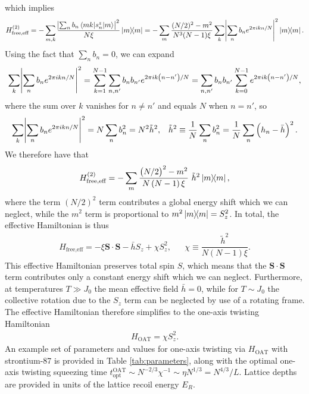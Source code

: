 \documentclass[aps,notitlepage,nofootinbib,11pt]{revtex4-1}
\renewcommand{\t}{\text} %
\newcommand{\f}[2]{\dfrac{#1}{#2}} %
\newcommand{\p}[1]{\left(#1\right)} %
\renewcommand{\v}{\bm} %
\renewcommand{\c}{\cdot} %
\newcommand{\bk}{\braket} %
\newcommand{\1}{\hat{\mathds{1}}}
\begin{document}
which implies
\begin{align}
  H_{\t{free,eff}}^{(2)}
  = -\sum_{m,k}
  \frac{\abs{\sum_n b_n \bk{mk|s_n^z|m}}^2}{N\xi} \op{m}
  = -\sum_m \f{(N/2)^2-m^2}{N^3(N-1)\xi}
  \sum_k \abs{\sum_n b_n e^{2\pi ikn/N}}^2 \op{m}.
\end{align}
Using the fact that $\sum_nb_n=0$, we can expand
\begin{align}
  \sum_k \abs{\sum_n b_n e^{2\pi ikn/N}}^2
  = \sum_{k=1}^{N-1} \sum_{n,n'} b_n b_{n'} e^{2\pi ik\p{n-n'}/N}
  = \sum_{n,n'} b_n b_{n'} \sum_{k=0}^{N-1} e^{2\pi ik\p{n-n'}/N},
\end{align}
where the sum over $k$ vanishes for $n\ne n'$ and equals $N$ when
$n=n'$, so
\begin{align}
  \sum_k \abs{\sum_n b_n e^{2\pi ikn/N}}^2
  = N \sum_n b_n^2 = N^2 \tilde h^2,
  &&
  \tilde h^2 \equiv \f1N \sum_n b_n^2 = \f1N \sum_n \p{h_n - \bar h}^2.
  \label{eq:sum_knn}
\end{align}
We therefore have that
\begin{align}
  H_{\t{free,eff}}^{(2)}
  = -\sum_m \f{\p{N/2}^2-m^2}{N\p{N-1}\xi}~ \tilde h^2 \op{m},
\end{align}
where the term $\p{N/2}^2$ term contributes a global energy shift
which we can neglect, while the $m^2$ term is proportional to
$m^2\op{m}=S_z^2$.  In total, the effective Hamiltonian is thus
\begin{align}
  H_{\t{free,eff}}
  = -\xi \v S \c \v S - \bar h S_z + \chi S_z^2,
  &&
  \chi \equiv \f{\tilde h^2}{N\p{N-1}\xi}.
\end{align}
This effective Hamiltonian preserves total spin $S$, which means that
the $\v S\c\v S$ term contributes only a constant energy shift which
we can neglect.  Furthermore, at temperatures $T\gg J_0$ the mean
effective field $\bar h=0$, while for $T\sim J_0$ the collective
rotation due to the $S_z$ term can be neglected by use of a rotating
frame.  The effective Hamiltonian therefore simplifies to the one-axis
twisting Hamiltonian
\begin{align}
  H_{\t{OAT}} = \chi S_z^2.
  \label{eq:H_OAT}
\end{align}
An example set of parameters and values for one-axis twisting via
$H_{\t{OAT}}$ with strontium-87 is provided in Table
\ref{tab:parameters}, along with the optimal one-axis twisting
squeezing time
$t_{\t{opt}}^{\t{OAT}}\sim N^{-2/3}\chi^{-1}\sim\eta
N^{1/3}=N^{4/3}/L$.  Lattice depths are provided in units of the
lattice recoil energy $E_R$.
\end{document}
